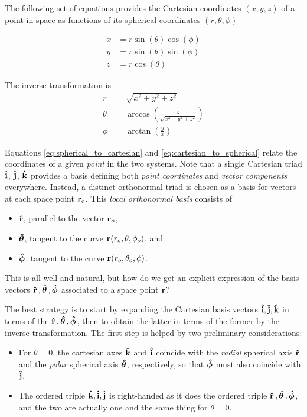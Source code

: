 The following set of equations provides the Cartesian coordinates $(x, y, z)$ of a point in space as functions of its spherical coordinates $(r, \theta, \phi)$ 

\begin{equation}
\label{eq:spherical_to_cartesian}
\begin{aligned}
x &= r \sin (\theta) \cos (\phi) \\
y &= r \sin (\theta) \sin (\phi) \\
z &= r \cos (\theta)
\end{aligned}
\end{equation}

The inverse transformation is 
\begin{equation}
\label{eq:cartesian_to_spherical}
\begin{aligned}
r      &= \sqrt{x^2 + y^2 + z^2} \\
\theta &= \arccos (\frac{z}{\sqrt{x^2 + y^2 + z^2}}) \\
\phi   &= \arctan (\frac{y}{x})
\end{aligned}
\end{equation}

Equations \ref{eq:spherical_to_cartesian} and \ref{eq:cartesian_to_spherical} relate the coordinates of a given \textit{point} in the two systems. Note that a single Cartesian triad $\vu{i}$, $\vu{j}$, $\vu{k}$ provides a basis defining both \textit{point coordinates} and \textit{vector components} everywhere. Instead, a distinct orthonormal triad is chosen as a basis for vectors at each space point $\vb{r}_o$. This \textit{local orthonormal basis} consists of
\begin{itemize}
\item $\vu{r}$, parallel to the vector $\vb{r}_o$,
\item $\vu*{\theta}$, tangent to the curve $\vb{r}(r_o, \theta, \phi_o)$, and 
\item $\vu*{\phi}$, tangent to the curve $\vb{r}(r_o, \theta_o, \phi)$.
\end{itemize}

This is all well and natural, but how do we get an explicit expression of the basis vectors $\vu{r}\,, \vu*{\theta}\,, \vu*{\phi}$ associated to a space point $\vb{r}$?   

The best strategy is to start by expanding the Cartesian basis vectors $\vu{i}, \vu{j}, \vu{k}$ in terms of the $\vu{r}\,, \vu*{\theta}\,, \vu*{\phi}$, then to obtain the latter in terms of the former by the inverse transformation. The first step is helped by two preliminary considerations:    
\begin{itemize}
\item For $\theta=0$, the cartesian axes $\vu{k}$ and $\vu{i}$ coincide with the \textit{radial} spherical axis $\vu{r}$ and the \textit{polar} spherical axis $\vu*{\theta}$, respectively, so that $\vu*{\phi}$ must also coincide with $\vu{j}$. 
\item The ordered triple $\vu{k}, \vu{i}, \vu{j}$ is right-handed as it does the ordered triple $\vu{r}\,, \vu*{\theta}\,, \vu*{\phi}$, and the two are actually one and the same thing for $\theta=0$. 
\end{itemize}

